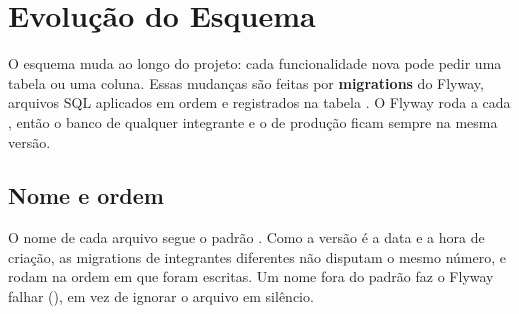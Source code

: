 \section{Evolução do Esquema}
\label{sec:evolucao}

O esquema muda ao longo do projeto: cada funcionalidade nova pode pedir uma
tabela ou uma coluna. Essas mudanças são feitas por \textbf{migrations} do
Flyway, arquivos SQL aplicados em ordem e registrados na tabela
. O Flyway roda a cada , então o banco de qualquer integrante e o de produção ficam sempre na
mesma versão.

\subsection{Nome e ordem}

O nome de cada arquivo segue o padrão
. Como a versão é a data e a hora
de criação, as migrations de integrantes diferentes não disputam o mesmo
número, e rodam na ordem em que foram escritas. Um nome fora do padrão faz o
Flyway falhar (), em vez de ignorar o arquivo em
silêncio.

